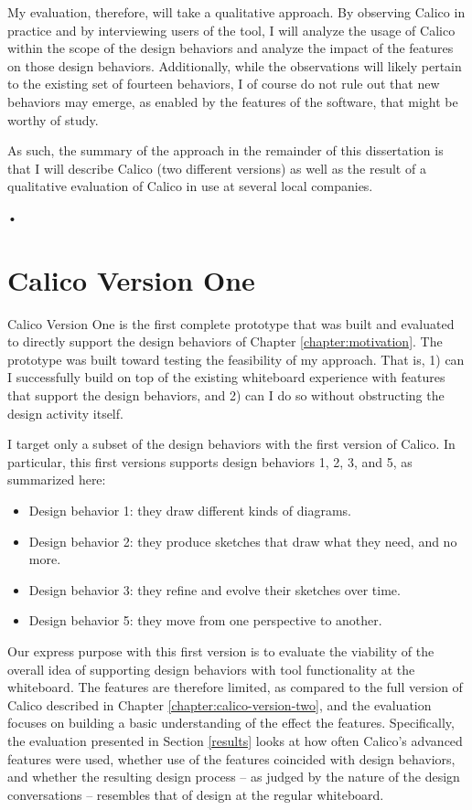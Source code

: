 \documentclass[12pt,fleqn]{ucithesis}
\begin{document}
My evaluation, therefore, will take a qualitative approach. By observing Calico in practice and by interviewing users of the tool, I will analyze the usage of Calico within the scope of the design behaviors and analyze the impact of the features on those design behaviors. Additionally, while the observations will likely pertain to the existing set of fourteen behaviors, I of course do not rule out that new behaviors may emerge, as enabled by the features of the software, that might be worthy of study. 

As such, the summary of the approach in the remainder of this dissertation is that I will describe Calico (two different versions) as well as the result of a qualitative evaluation of Calico in use at several local companies.

 \newpage 
 \newpage \textsf{•}\chapter{Calico Version One}
\label{chapter:calico-version-one}

Calico Version One is the first complete prototype that was built and evaluated to directly support the design behaviors of Chapter \ref{chapter:motivation}. The prototype was built toward testing the feasibility of my approach. That is, 1) can I successfully build on top of the existing whiteboard experience with features that support the design behaviors, and 2) can I do so without obstructing the design activity itself.

I target only a subset of the design behaviors with the first version of Calico.  In particular, this first versions supports design behaviors 1, 2, 3, and 5, as summarized here:

\begin{itemize}
  \item Design behavior 1: they draw different kinds of diagrams.
  \item Design behavior 2: they produce sketches that draw what they need, and no more.
  \item Design behavior 3: they refine and evolve their sketches over time.
  \item Design behavior 5: they move from one perspective to another.
\end{itemize}

Our express purpose with this first version is to evaluate the viability of the overall idea of supporting design behaviors with tool functionality at the whiteboard.  The features are therefore limited, as compared to the full version of Calico described in Chapter \ref{chapter:calico-version-two}, and the evaluation focuses on building a basic understanding of the effect the features.  Specifically, the evaluation presented in Section \ref{results} looks at how often Calico's advanced features were used, whether use of the features coincided with design behaviors, and whether the resulting design process -- as judged by the nature of the design conversations -- resembles that of design at the regular whiteboard.
\end{document}
